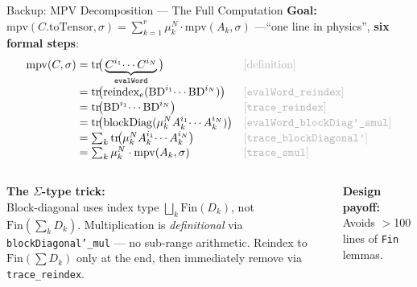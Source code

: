 \documentclass[aspectratio=169,10pt]{beamer}
\begin{document}
\begin{frame}[fragile]{Backup: MPV Decomposition --- The Full Computation}
\vspace{-0.6em}
{\small\textbf{Goal:} $\mathrm{mpv}(C.\mathrm{toTensor}, \sigma) = \sum_{k=1}^{r} \mu_k^N \cdot \mathrm{mpv}(A_k, \sigma)$
\quad---\quad ``one line in physics'', \textbf{six formal steps}:}
\vspace{-0.4em}
{\scriptsize
\begin{align*}
\mathrm{mpv}(C, \sigma) &= \mathrm{tr}\!\big(\underbrace{C^{i_1}\!\cdots C^{i_N}}_{\texttt{evalWord}}\big) && \text{\textcolor{dimwhite}{[definition]}}\\[-3pt]
&= \mathrm{tr}\!\big(\mathrm{reindex}_e(\mathrm{BD}^{i_1}\!\cdots \mathrm{BD}^{i_N})\big) && \text{\textcolor{dimwhite}{[\texttt{evalWord\_reindex}]}}\\[-3pt]
&= \mathrm{tr}\!\big(\mathrm{BD}^{i_1}\!\cdots \mathrm{BD}^{i_N}\big) && \text{\textcolor{dimwhite}{[\texttt{trace\_reindex}]}}\\[-3pt]
&= \mathrm{tr}\!\big(\mathrm{blockDiag}(\mu_k^N A_k^{i_1}\!\cdots A_k^{i_N})\big) && \text{\textcolor{dimwhite}{[\texttt{evalWord\_blockDiag'\_smul}]}}\\[-3pt]
&= \textstyle\sum_k \mathrm{tr}\!\big(\mu_k^N A_k^{i_1}\!\cdots A_k^{i_N}\big) && \text{\textcolor{dimwhite}{[\texttt{trace\_blockDiagonal'}]}}\\[-3pt]
&= \textstyle\sum_k \mu_k^N \cdot \mathrm{mpv}(A_k, \sigma) && \text{\textcolor{dimwhite}{[\texttt{trace\_smul}]}}
\end{align*}
}

\vspace{-0.8em}
\begin{columns}[T]
{\small\textbf{The $\Sigma$-type trick:}}\\[0.05em]
{\scriptsize Block-diagonal uses index type
$\bigsqcup_k \mathrm{Fin}(D_k)$, not $\mathrm{Fin}(\sum_k D_k)$.
Multiplication is \emph{definitional} via \texttt{blockDiagonal'\_mul} --- no sub-range arithmetic.
Reindex to $\mathrm{Fin}(\sum D_k)$ only at the end, then immediately remove via \texttt{trace\_reindex}.}

\vspace{0.1em}
{\small\textbf{\textcolor{leangreen}{Design payoff:}} Avoids $>$100 lines of \texttt{Fin} lemmas.}


\end{columns}
\end{frame}
\end{document}
